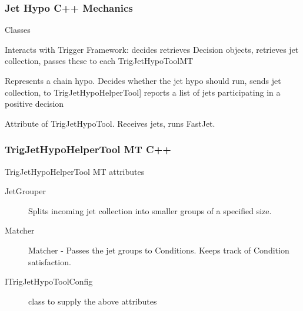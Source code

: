 \documentclass{beamer}
\begin{document}
 \frame
{
\frametitle{Jet Hypo C++ Mechanics}

\begin{block}{Classes}
\begin{description}
\item[TrigJetHypoAlgMT] Interacts with Trigger Framework: decides
retrieves Decision objects, retrieves jet collection, passes these to each TrigJetHypoToolMT
\item[TrigJetHypoToolMT] Represents a chain hypo. Decides
whether the jet hypo should run, sends jet collection, to  TrigJetHypoHelperTool]  
reports a list of jets participating in a positive decision
\item[TrigJetHypoHelperToolMT] Attribute of TrigJetHypoTool. Receives jets, runs FastJet.
\item 
\end{description}
\end{block}
}

\frame
{
\frametitle{TrigJetHypoHelperTool MT C++}
\begin{block}{TrigJetHypoHelperTool MT attributes}
\begin{description}
\item[JetGrouper ]  Splits incoming jet collection into smaller groups of a specified size.
\item[Matcher ]  Matcher - Passes the jet groups to Conditions. Keeps track of Condition satisfaction.
\item[ITrigJetHypoToolConfig] class to supply the above attributes
\end{description}
\end{block}
}

\end{document}
